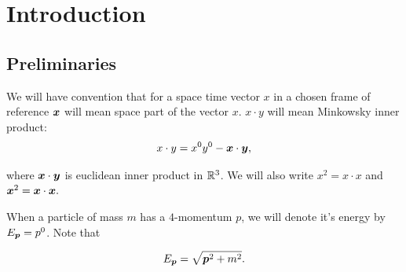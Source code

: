\documentclass[main.tex]{subfiles}
\begin{document}
\section{Introduction}

\subsection{Preliminaries}

We will have convention that for a space time vector $x$ in a chosen frame of reference $\boldsymbol{x}$ will mean space part of the vector $x$. $x\cdot y$ will mean Minkowsky inner product:
\begin{equation}
x\cdot y = x^0 y^0 - \boldsymbol{x}\cdot \boldsymbol{y},
\end{equation}

where $\boldsymbol{x}\cdot \boldsymbol{y}$ is euclidean inner product in $\mathbb{R}^3$. We will also write $x^2 = x\cdot x$ and $\boldsymbol{x}^2 = \boldsymbol{x}\cdot\boldsymbol{x}.$

When a particle of mass $m$ has a $4$-momentum $p$, 
we will denote it's energy by $E_{\boldsymbol{p}} = p^0$. 
Note that

\begin{equation}
E_{\boldsymbol{p}} = \sqrt{\boldsymbol{p}^2 + m^2}.
\end{equation}
\end{document}
